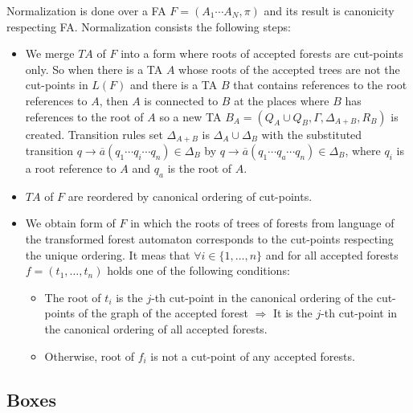 Normalization is done over a FA $F = (A_1 \cdots A_N,\pi)$ and its result is canonicity respecting FA.
Normalization consists the following steps:
\begin{itemize}
		\item We merge $TA$ of $F$ into a form where roots of accepted forests are cut-points only.
			So when there is a TA $A$ whose roots of the accepted trees are
			not the cut-points in $L(F)$ and there is a TA $B$ that contains references
			to the root references to $A$, then $A$ is connected
			to $B$ at the places where $B$ has references to the root of $A$ so a new
			TA $B_A = (Q_A \cup Q_B, \Gamma, \Delta_{A+B}, R_B)$ is created.
			Transition rules set $\Delta_{A+B}$ is $\Delta_A \cup \Delta_B$ with
			the substituted transition $q \rightarrow  \overline{a} (q_1 \cdots q_i \cdots q_n) \in \Delta_B$
			by $q \rightarrow  \overline{a} (q_1 \cdots q_a \cdots q_n) \in \Delta_B$,
			where $q_i$ is a root reference to $A$ and $q_a$ is the root of $A$. 
		\item $TA$ of $F$ are reordered by canonical ordering of cut-points.
		\item We obtain form of $F$ in which the roots of trees of forests from language of the transformed
			forest automaton corresponds to the cut-points respecting the unique ordering.
			It meas that $\forall i \in \{1,\ldots,n\}$ and for all accepted forests $f=(t_1,\ldots,t_n)$ holds
			one of the following conditions:
			\begin{itemize}
				\item The root of $t_i$ is the $j$-th cut-point in the canonical ordering of the cut-points
					of the graph of the accepted forest $\Rightarrow$
					It is the $j$-th cut-point in the canonical ordering of all accepted forests.
				\item Otherwise, root of $f_i$ is not a cut-point of any accepted forests.
			\end{itemize}
\end{itemize}

\subsection{Boxes}
\label{subsec:boxes}

